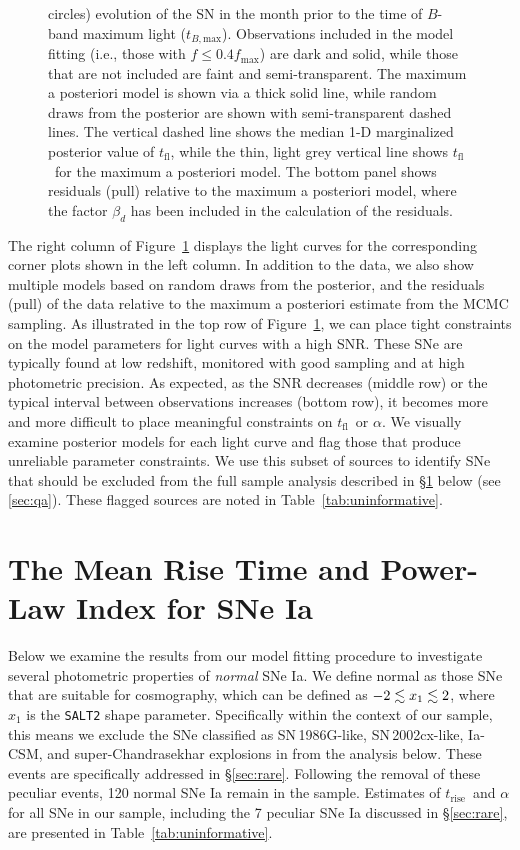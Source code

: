 \documentclass[twocolumn]{./aastex63}
\newcommand{\tfl}{$t_\mathrm{fl}$}
\newcommand{\trise}{$t_\mathrm{rise}$}
\newcommand{\tbmax}{$t_{B,\mathrm{max}}$}
\begin{document}
\begin{figure}
{    circles) evolution of the SN in the month prior to the time of $B$-band
    maximum light (\tbmax). Observations included in the model fitting (i.e.,
    those with $f \le 0.4 f_\mathrm{max}$) are dark and solid, while those
    that are not included are faint and semi-transparent. The maximum a
    posteriori model is shown via a thick solid line, while random draws from
    the posterior are shown with semi-transparent dashed lines. The vertical
    dashed line shows the median 1-D marginalized posterior value of \tfl,
    while the thin, light grey vertical line shows \tfl\ for the maximum a
    posteriori model. The bottom panel shows residuals (pull) relative to the
    maximum a posteriori model, where the factor $\beta_d$ has been included
    in the calculation of the residuals.}
    \label{fig:corner_LC}
\end{figure}

The right column of Figure~\ref{fig:corner_LC} displays the light curves for the
corresponding corner plots shown in the left column. In addition to the data, we
also show multiple models based on random draws from the posterior, and the
residuals (pull) of the data relative to the maximum a posteriori estimate from
the MCMC sampling. As illustrated in the top row of Figure~\ref{fig:corner_LC},
we can place tight constraints on the model parameters for light curves with a
high SNR. These SNe are typically found at low redshift, monitored with good
sampling and at high photometric precision. As expected, as the SNR decreases
(middle row) or the typical interval between observations increases (bottom
row), it becomes more and more difficult to place meaningful constraints on
\tfl\ or $\alpha$. We visually examine posterior models for each light curve and
flag those that produce unreliable parameter constraints. We use this subset of
sources to identify SNe that should be excluded from the full sample analysis
described in \S\ref{sec:mean_parameters} below (see \ref{sec:qa}). These flagged
sources are noted in Table~\ref{tab:uninformative}.

\section{The Mean Rise Time and Power-Law Index for SNe
Ia}\label{sec:mean_parameters}

Below we examine the results from our model fitting procedure to investigate
several photometric properties of \textit{normal} SNe Ia. We define normal as
those SNe that are suitable for cosmography, which can be defined as $-2 \lesssim x_1
\lesssim 2$, where $x_1$ is the \texttt{SALT2} shape parameter. Specifically within
the context of our sample, this means we exclude the SNe classified as
SN\,1986G-like, SN\,2002cx-like, Ia-CSM, and super-Chandrasekhar explosions in
\citet{Yao19} from the analysis below. These events are specifically addressed
in \S\ref{sec:rare}. Following the removal of these peculiar events, 120 normal
SNe Ia remain in the sample. Estimates of \trise\ and $\alpha$ for all SNe in
our sample, including the 7 peculiar SNe Ia discussed in \S\ref{sec:rare}, are
presented in Table~\ref{tab:uninformative}.
\end{document}
